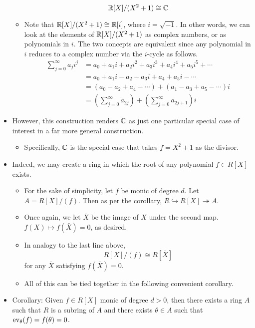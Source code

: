 \documentclass[../notes.tex]{subfiles}
\begin{document}
\begin{itemize}
\begin{itemize}
\begin{equation*}
            \mathbb{R}[X]/(X^2+1) \cong \mathbb{C}
        \end{equation*}
        \item Note that $\mathbb{R}[X]/(X^2+1)\cong\mathbb{R}[i]$, where $i=\sqrt{-1}$. In other words, we can look at the elements of $\mathbb{R}[X]/(X^2+1)$ as complex numbers, or as polynomials in $i$. The two concepts are equivalent since any polynomial in $i$ reduces to a complex number via the $i$-cycle as follows.
        \begin{align*}
            \sum_{j=0}^\infty a_ji^j &= a_0+a_1i+a_2i^2+a_3i^3+a_4i^4+a_5i^5+\cdots\\
            &= a_0+a_1i-a_2-a_3i+a_4+a_5i-\cdots\\
            &= (a_0-a_2+a_4-\cdots)+(a_1-a_3+a_5-\cdots)i\\
            &= \left( \sum_{j=0}^\infty a_{2j} \right)+\left( \sum_{j=0}^\infty a_{2j+1} \right)i
        \end{align*}
    \end{itemize}
    \item However, this construction renders $\mathbb{C}$ as just one particular special case of interest in a far more general construction.
    \begin{itemize}
        \item Specifically, $\mathbb{C}$ is the special case that takes $f=X^2+1$ as the divisor.
    \end{itemize}
    \item Indeed, we may create a ring in which the root of any polynomial $f\in R[X]$ exists.
    \begin{itemize}
        \item For the sake of simplicity, let $f$ be monic of degree $d$. Let $A=R[X]/(f)$. Then as per the corollary, $R\hookrightarrow R[X]\twoheadrightarrow A$.
        \item Once again, we let $\bar{X}$ be the image of $X$ under the second map. $f(X)\mapsto f(\bar{X})=0$, as desired.
        \item In analogy to the last line above,
        \begin{equation*}
            R[X]/(f) \cong R[\bar{X}]
        \end{equation*}
        for any $\bar{X}$ satisfying $f(\bar{X})=0$.
        \item All of this can be tied together in the following convenient corollary.
    \end{itemize}
    \item Corollary: Given $f\in R[X]$ monic of degree $d>0$, then there exists a ring $A$ such that $R$ is a subring of $A$ and there exists $\theta\in A$ such that $\operatorname{ev}_\theta(f)=f(\theta)=0$.

\end{itemize}
\end{document}
